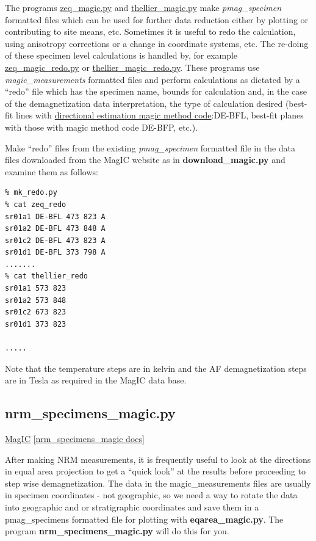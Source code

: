 \documentclass[11pt]{book}
\begin{document}
{{The programs \href{#zeq_magic.py}{zeq\_magic.py} and \href{#thellier_magic.py}{thellier\_magic.py} make {\it pmag\_specimen} formatted files which can be used for further data reduction either by plotting or contributing to site means, etc.  Sometimes it is useful to redo the calculation, using anisotropy corrections or a change in coordinate systems, etc.  The re-doing of these specimen level calculations is handled by, for example \href{#zeq_magic_redo.py}{zeq\_magic\_redo.py} or \href{#thellier_magic_redo.py}{ thellier\_magic\_redo.py}.  These programs use {\it magic\_measurements} formatted files and perform calculations as dictated by a ``redo'' file which has the specimen name, bounds for calculation and, in the case of the demagnetization data interpretation, the type of calculation desired (best-fit lines with \href{http://earthref.org/cgi-bin/magic-s1-methods.cgi?database_name=magic\qquad &search_start=methods\qquad &category=Direction%20Estimation}{directional estimation magic method code}:{DE-BFL}, best-fit planes with those with  magic method code DE-BFP, etc.).

 Make ``redo'' files from the existing  {\it pmag\_specimen} formatted file in the data files downloaded from the MagIC website as in {\bf download\_magic.py} and examine them as follows:

\begin{verbatim}
% mk_redo.py
% cat zeq_redo
sr01a1 DE-BFL 473 823 A
sr01a2 DE-BFL 473 848 A
sr01c2 DE-BFL 473 823 A
sr01d1 DE-BFL 373 798 A
.......
% cat thellier_redo
sr01a1 573 823
sr01a2 573 848
sr01c2 673 823
sr01d1 373 823

.....
\end{verbatim}

\noindent Note that the temperature steps are in kelvin and the AF demagnetization steps are in Tesla as required in the MagIC data base.



%

\subsection{nrm\_specimens\_magic.py}
\href{#MagIC}{MagIC}
\href{https://github.com/PmagPy/PmagPy/blob/master/programs/nrm_specimens_magic.py}{[nrm\_specimens\_magic docs]}

After making NRM measurements, it is frequently useful to look at the directions in equal area projection to get a ``quick look'' at the results before proceeding to step wise demagnetization.  The data in the magic\_measurements files are usually in specimen coordinates - not geographic, so we need a way to rotate the data into geographic and or stratigraphic coordinates and save them in a pmag\_specimens formatted file for plotting with {\bf eqarea\_magic.py}.   The program {\bf nrm\_specimens\_magic.py} will do this for you.

}}
\end{document}

